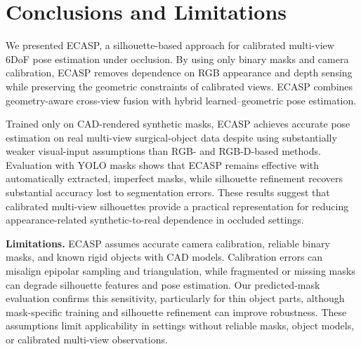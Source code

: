 \chapter{Conclusions and Limitations}
\label{sec:conclusion}

We presented ECASP, a silhouette-based approach for calibrated multi-view 6DoF pose estimation under occlusion.
By using only binary masks and camera calibration, ECASP removes dependence on RGB appearance and depth sensing while preserving the geometric constraints of calibrated views.
ECASP combines geometry-aware cross-view fusion with hybrid learned--geometric pose estimation.

Trained only on CAD-rendered synthetic masks, ECASP achieves accurate pose estimation on real multi-view surgical-object data despite using substantially weaker visual-input assumptions than RGB- and RGB-D-based methods.
Evaluation with YOLO masks shows that ECASP remains effective with automatically extracted, imperfect masks, while silhouette refinement recovers substantial accuracy lost to segmentation errors.
These results suggest that calibrated multi-view silhouettes provide a practical representation for reducing appearance-related synthetic-to-real dependence in occluded settings.

\textbf{Limitations.} ECASP assumes accurate camera calibration, reliable binary masks, and known rigid objects with CAD models.
Calibration errors can misalign epipolar sampling and triangulation, while fragmented or missing masks can degrade silhouette features and pose estimation.
Our predicted-mask evaluation confirms this sensitivity, particularly for thin object parts, although mask-specific training and silhouette refinement can improve robustness.
These assumptions limit applicability in settings without reliable masks, object models, or calibrated multi-view observations.